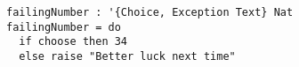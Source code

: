 \begin{algorithm}

\begin{verbatim}
failingNumber : '{Choice, Exception Text} Nat
failingNumber = do
  if choose then 34
  else raise "Better luck next time"
\end{verbatim}

\caption{Effect composition in Unison. %
\label{alg-eff:composition}}
\end{algorithm}